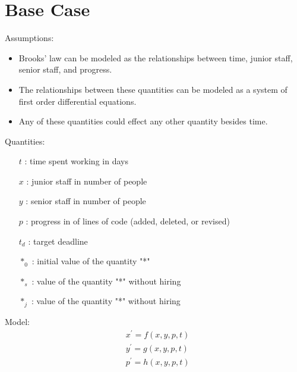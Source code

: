 \documentclass{article}
\newenvironment{atomize}
    {\begin{list} {} {
            \setlength\itemindent{0pt}
            \setlength\leftmargin{10pt}
            \setlength\labelwidth{0pt}
    }}
    {\end{list}}
\begin{document}
\section*{Base Case}
  \begin{atomize}
    \item Assumptions:
      \begin{itemize}
        \item Brooks' law can be modeled as the relationships between
        time, junior staff, senior staff, and progress.
        \item The relationships between these quantities can be modeled
        as a system of first order differential equations.
        \item Any of these quantities could effect any other quantity besides
        time.  
        \end{itemize}

    \item Quantities:
      \begin{itemize}
        \item [$t$]: time spent working in days
        \item [$x$]: junior staff in number of people
        \item [$y$]: senior staff in number of people
        \item [$p$]: progress in of lines of code (added, deleted, or revised)
        \item [$t_{d}$]: target deadline
        \item [$*_{0}$]: initial value of the quantity "*"
        \item [$*_{s}$]: value of the quantity "*" without hiring
        \item [$*_{j}$]: value of the quantity "*" without hiring
      \end{itemize}
  
    \item Model:
      \begin{align*}
        &x^{\prime} = f\left(x, y, p, t\right) \\[6pt]
        &y^{\prime} = g\left(x, y, p, t\right) \\[6pt]
        &p^{\prime} = h\left(x, y, p, t\right)
      \end{align*}
  \end{atomize}

\pagebreak
\end{document}
